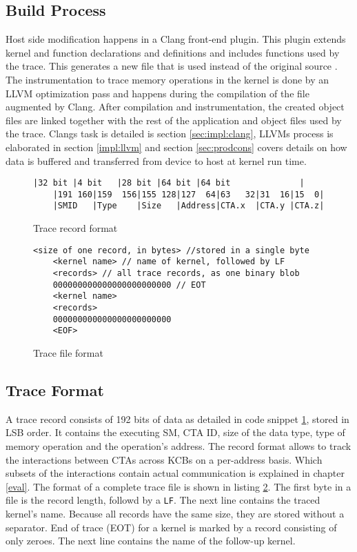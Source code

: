 \subsection{Build Process}
Host side modification happens in a Clang front-end plugin. This plugin extends kernel and function declarations and definitions and includes functions used by the trace. This generates a new file that is used instead of the original source . The instrumentation to trace memory operations in the kernel is done by an LLVM optimization pass and happens during the compilation of the file augmented by Clang. After compilation and instrumentation, the created object files are linked together with the rest of the application and object files used by the trace.
Clangs task is detailed is section \ref{sec:impl:clang}, LLVMs process is elaborated in section \ref{impl:llvm} and section \ref{sec:prodcons} covers details on how data is buffered and transferred from device to host at kernel run time.
\begin{figure}[t]
	\begin{lstlisting}[style=C]
	|32 bit |4 bit   |28 bit |64 bit |64 bit        	  |
	|191 160|159  156|155 128|127  64|63   32|31  16|15  0|
	|SMID   |Type    |Size   |Address|CTA.x  |CTA.y |CTA.z|	\end{lstlisting}
	\caption{Trace record format}
	\label{trace rec}
\end{figure}
\begin{figure}[t]
	\begin{lstlisting}[style=C]
	<size of one record, in bytes> //stored in a single byte
	<kernel name> // name of kernel, followed by LF
	<records> // all trace records, as one binary blob
	000000000000000000000000 // EOT
	<kernel name>
	<records>
	000000000000000000000000
	<EOF>	\end{lstlisting}
	\caption{Trace file format}
	\label{trace file}
\end{figure}
\subsection{Trace Format}
A trace record consists of 192 bits of data as detailed in code snippet \ref{trace rec}, stored in LSB order. It contains the executing SM, CTA ID, size of the data type, type of memory operation and the operation's address. The record format allows to track the interactions between CTAs across KCBs on a per-address basis. Which subsets of the interactions contain actual communication is explained in chapter \ref{eval}.
The format of a complete trace file is shown in listing \ref{trace file}. The first byte in a file is the record length, followd by a \verb|LF|. The next line contains the
traced kernel's name. Because all records have the same size, they are stored without a separator. End of trace (EOT) for a kernel is marked by a record consisting of only zeroes. The next line contains the name of the follow-up kernel.




